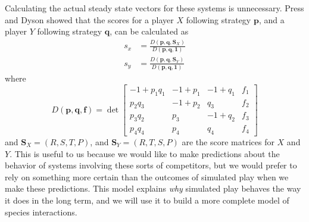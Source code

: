 \documentclass{article}
\renewcommand{\vec}[1]{\mathbf{#1}}
\begin{document}
Calculating the actual steady state vectors for these systems is unnecessary. Press and Dyson showed that the scores for a player \(X\) following strategy \(\vec{p}\), and a player \(Y\) following strategy \(\vec{q}\), can be calculated as
\begin{equation}
\begin{aligned} \label{eq:scores}
s_x &= \frac{D(\vec{p}, \vec{q}, \vec{S}_X)}{D(\vec{p},\vec{q},\vec{1})} \\
s_y &= \frac{D(\vec{p}, \vec{q}, \vec{S}_Y)}{D(\vec{p}, \vec{q}, \vec{1})}
\end{aligned}
\end{equation}
where
\[D(\vec{p}, \vec{q}, \vec{f}) = 
\det{\begin{bmatrix} 
-1 + p_1 q_1 & -1 + p_1 & -1 + q_1 & f_1 \\
     p_2 q_3 & -1 + p_2 &      q_3 & f_2 \\
     p_3 q_2 &      p_3 & -1 + q_2 & f_3 \\
     p_4 q_4 &      p_4 &      q_4 & f_4
\end{bmatrix}}\]
and \(\vec{S}_X = (R, S, T, P)\), and \(\vec{S}_Y = (R, T, S, P)\) are the score matrices for \(X\) and \(Y\). This is useful to us because we would like to make predictions about the behavior of systems involving these sorts of competitors, but we would prefer to rely on something more certain than the outcomes of simulated play when we make these predictions. This model explains \emph{why} simulated play behaves the way it does in the long term, and we will use it to build a more complete model of species interactions.
\end{document}
